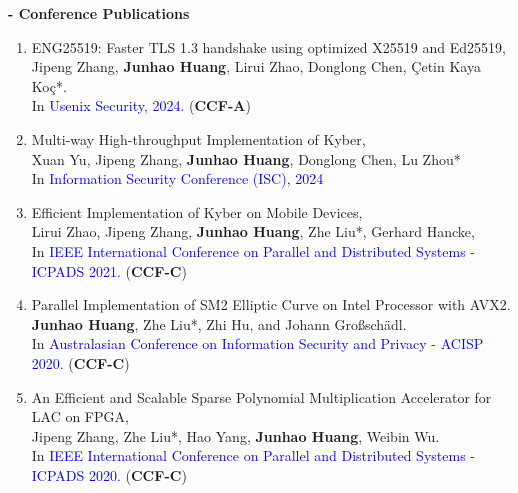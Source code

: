 \documentclass[letterpaper,11pt]{article}
\begin{document}
\textbf{- Conference Publications}
\begin{enumerate}\setlength{\itemsep}{0pt}
	\item {ENG25519: Faster TLS 1.3 handshake using optimized X25519 and Ed25519,\\ 
	Jipeng Zhang, \textbf{Junhao Huang}, Lirui Zhao, Donglong Chen, Çetin Kaya Koç*.\\ 
	In \textcolor{blue}{Usenix Security, 2024.} (\textbf{CCF-A})
	}

	\item {Multi-way High-throughput Implementation of Kyber,\\ 
	Xuan Yu, Jipeng Zhang, \textbf{Junhao Huang}, Donglong Chen, Lu Zhou*\\
	In \textcolor{blue}{Information Security Conference (ISC), 2024}
	}

	\item {Efficient Implementation of Kyber on Mobile Devices,\\
	Lirui Zhao, Jipeng Zhang, \textbf{Junhao Huang}, Zhe Liu*, Gerhard Hancke,\\
	In \textcolor{blue}{IEEE International Conference on Parallel and Distributed Systems - ICPADS 2021.} (\textbf{CCF-C})
	}

	\item {Parallel Implementation of SM2 Elliptic Curve on Intel Processor with AVX2. \\\textbf{Junhao Huang}, Zhe Liu*, Zhi Hu, and Johann Großschädl. \\ In \textcolor{blue}{Australasian Conference on Information Security and Privacy - ACISP 2020. } (\textbf{CCF-C})
	}

	\item {An Efficient and Scalable Sparse Polynomial Multiplication Accelerator for LAC on FPGA,\\
	Jipeng Zhang, Zhe Liu*, Hao Yang, \textbf{Junhao Huang}, Weibin Wu. \\
	In \textcolor{blue}{IEEE International Conference on Parallel and Distributed Systems - ICPADS 2020.} (\textbf{CCF-C})
	}

\end{enumerate}
\end{document}
